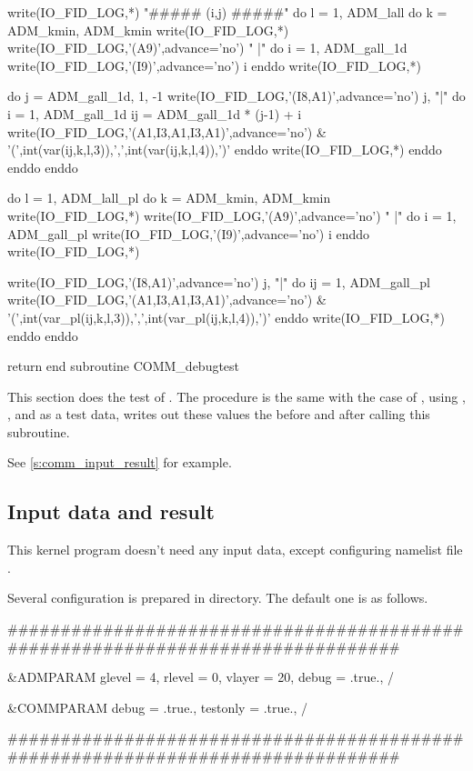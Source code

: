 \begin{LstF90}[name=COMM_debugtest,firstnumber=last]
  write(IO_FID_LOG,*) "##### (i,j) #####"
  do l  = 1, ADM_lall
  do k = ADM_kmin, ADM_kmin
     write(IO_FID_LOG,*)
     write(IO_FID_LOG,'(A9)',advance='no') "        |"
     do i = 1, ADM_gall_1d
        write(IO_FID_LOG,'(I9)',advance='no') i
     enddo
     write(IO_FID_LOG,*)

     do j = ADM_gall_1d, 1, -1
        write(IO_FID_LOG,'(I8,A1)',advance='no') j, "|"
        do i = 1, ADM_gall_1d
           ij = ADM_gall_1d * (j-1) + i
           write(IO_FID_LOG,'(A1,I3,A1,I3,A1)',advance='no') &
                      '(',int(var(ij,k,l,3)),',',int(var(ij,k,l,4)),')'
        enddo
        write(IO_FID_LOG,*)
     enddo
  enddo
  enddo

  do l  = 1, ADM_lall_pl
  do k = ADM_kmin, ADM_kmin
     write(IO_FID_LOG,*)
     write(IO_FID_LOG,'(A9)',advance='no') "        |"
     do i = 1, ADM_gall_pl
        write(IO_FID_LOG,'(I9)',advance='no') i
     enddo
     write(IO_FID_LOG,*)

     write(IO_FID_LOG,'(I8,A1)',advance='no') j, "|"
     do ij = 1, ADM_gall_pl
        write(IO_FID_LOG,'(A1,I3,A1,I3,A1)',advance='no') &
                   '(',int(var_pl(ij,k,l,3)),',',int(var_pl(ij,k,l,4)),')'
     enddo
     write(IO_FID_LOG,*)
  enddo
  enddo

  return
end subroutine COMM_debugtest
\end{LstF90}
%
This section does the test of .
%
The procedure is the same with the case of ,
using , ,  and  as a test data,
writes out these values the before and after calling this subroutine.

See \autoref{s:comm_input_result} for example.




\subsection{Input data and result}\label{s:comm_input_result}

This kernel program doesn't need any input data, except configuring
namelist file .

Several configuration is prepared in  directory.
%
The default one is as follows.

\begin{LstLog}
################################################################################

&ADMPARAM
    glevel = 4,
    rlevel = 0,
    vlayer = 20,
    debug  = .true.,
/

&COMMPARAM
    debug    = .true.,
    testonly = .true.,
/

################################################################################
\end{LstLog}


